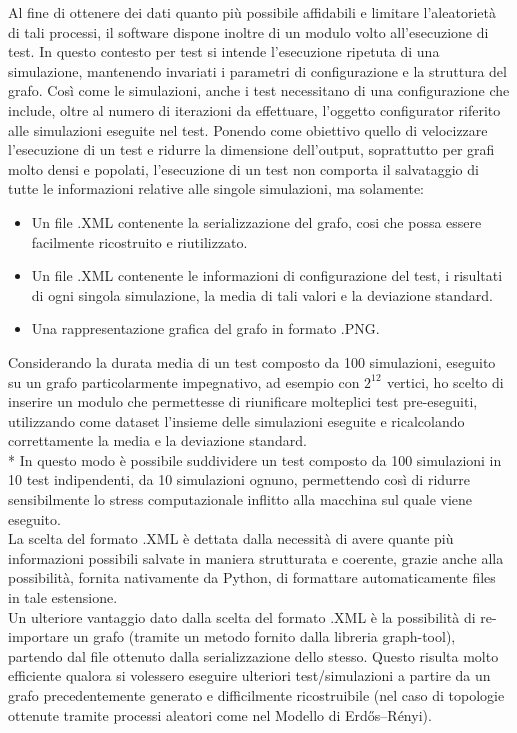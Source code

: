 \documentclass{article}
\begin{document}
Al fine di ottenere dei dati quanto più possibile affidabili e limitare l'aleatorietà di tali processi, il software dispone inoltre di un modulo volto all'esecuzione di test. In questo contesto per test si intende l'esecuzione ripetuta di una simulazione, mantenendo invariati i parametri di configurazione e la struttura del grafo. Così come le simulazioni, anche i test necessitano di una configurazione che include, oltre al numero di iterazioni da effettuare, l'oggetto configurator riferito alle simulazioni eseguite nel test.
Ponendo come obiettivo quello di velocizzare l'esecuzione di un test e ridurre la dimensione dell'output, soprattutto per grafi molto densi e popolati, l'esecuzione di un test non comporta il salvataggio di tutte le informazioni relative alle singole simulazioni, ma solamente:
\begin{itemize}
\item Un file .XML contenente la serializzazione del grafo, cosi che possa essere facilmente ricostruito e riutilizzato.
\item Un file .XML contenente le informazioni di configurazione del test, i risultati di ogni singola simulazione, la media di tali valori e la deviazione standard.
\item Una rappresentazione grafica del grafo in formato .PNG.
\end{itemize}
Considerando la durata media di un test composto da 100 simulazioni, eseguito su un grafo particolarmente impegnativo, ad esempio con $2^{12^{\mathrm{}}}$ vertici, ho scelto di inserire un modulo che permettesse di riunificare molteplici test pre-eseguiti, utilizzando come dataset l'insieme delle simulazioni eseguite e ricalcolando correttamente la media e la deviazione standard.\\*
In questo modo è possibile suddividere un test composto da 100 simulazioni in 10 test indipendenti, da 10 simulazioni ognuno, permettendo così di ridurre sensibilmente lo stress computazionale inflitto alla macchina sul quale viene eseguito.\\
La scelta del formato .XML è dettata dalla necessità di avere quante più informazioni possibili salvate in maniera strutturata e coerente, grazie anche alla possibilità, fornita nativamente da Python, di formattare automaticamente files in tale estensione.\\
Un ulteriore vantaggio dato dalla scelta del formato .XML è la possibilità di re-importare un grafo (tramite un metodo fornito dalla libreria graph-tool), partendo dal file ottenuto dalla serializzazione dello stesso. Questo risulta molto efficiente qualora si volessero eseguire ulteriori test/simulazioni a partire da un grafo precedentemente generato e difficilmente ricostruibile (nel caso di topologie ottenute tramite processi aleatori come nel Modello di Erdős–Rényi).
\end{document}
